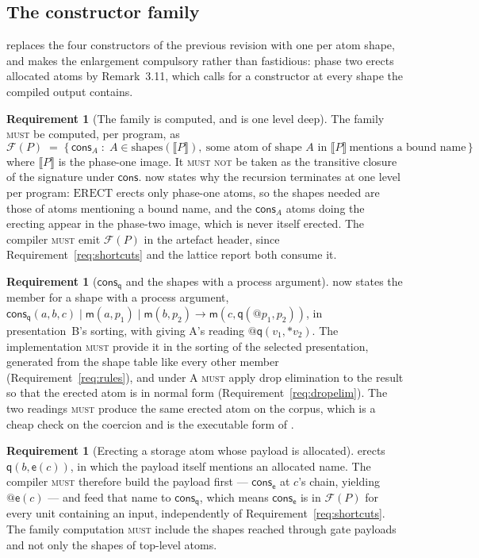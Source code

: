 \documentclass[11pt,a4paper]{article}
\makeatletter
\newcommand{\MUST}{\textsc{must}}
\newcommand{\MUSTNOT}{\textsc{must not}}
\newcommand{\quo}[1]{@#1}
\newcommand{\drp}[1]{{*}#1}
\newcommand{\enc}[1]{\llbracket #1 \rrbracket}
\newcommand{\mm}{\mathsf{m}}
\newcommand{\ev}{\mathsf{e}}
\newcommand{\qq}{\mathsf{q}}
\newcommand{\cons}{\mathsf{cons}}
\newcommand{\red}{\longrightarrow}
\newcommand{\shapes}{\mathrm{shapes}}
\newcommand{\ERECT}{\mathrm{ERECT}}
\theoremstyle{definition}
\newtheorem{requirement}[definition]{Requirement}
\theoremstyle{plain}
\makeatother
\begin{document}
\subsection{The constructor family}\label{sec:family}

\cite[Def.~3.8]{draft3} replaces the four constructors of the previous
revision with one per atom shape, and \cite[Rem.~3.13]{draft3} makes the
enlargement compulsory rather than fastidious: phase two erects allocated
atoms by Remark~3.11, which calls for a constructor at every shape the
compiled output contains.

\begin{requirement}[The family is computed, and is one level deep]
\label{req:family}
The family \MUST{} be computed, per program, as
\[
  \mathcal{F}(P) \;=\; \{\,\cons_{A} \;:\; A \in \shapes(\enc{P}),\ \text{some
  atom of shape } A \text{ in } \enc{P}\ \text{mentions a bound name}\,\}
\]
where $\enc{P}$ is the phase-one image. It \MUSTNOT{} be taken as the
transitive closure of the signature under $\cons$. \cite[Rem.~6.15]{draft3}
now states why the recursion terminates at one level per program: $\ERECT$
erects only phase-one atoms, so the shapes needed are those of atoms
mentioning a bound name, and the $\cons_{A}$ atoms doing the erecting appear
in the phase-two image, which is never itself erected. The compiler
\MUST{} emit $\mathcal{F}(P)$ in the artefact header, since
Requirement~\ref{req:shortcuts} and the lattice report both consume it.
\end{requirement}

\begin{requirement}[$\cons_{\qq}$ and the shapes with a process argument]
\label{req:consq}
\cite[Def.~3.8]{draft3} now states the member for a shape with a process
argument, $\cons_{\qq}(a,b,c) \mid \mm(a,p_{1}) \mid \mm(b,p_{2}) \red
\mm(c,\qq(\quo{p_{1}},p_{2}))$, in presentation~B's sorting, with
\cite[Rem.~3.9]{draft3} giving A's reading
$\quo{\qq(v_{1},\drp{v_{2}})}$. The implementation \MUST{} provide it in the
sorting of the selected presentation, generated from the shape table like
every other member (Requirement~\ref{req:rules}), and under A \MUST{} apply
drop elimination to the result so that the erected atom is in normal form
(Requirement~\ref{req:dropelim}). The two readings \MUST{} produce the same
erected atom on the corpus, which is a cheap check on the coercion and is the
executable form of \cite[Rem.~3.9]{draft3}.
\end{requirement}

\begin{requirement}[Erecting a storage atom whose payload is allocated]
\label{req:qpayload}
\cite[Ex.~6.9]{draft3} erects $\qq(b,\ev(c))$, in which the payload itself
mentions an allocated name. The compiler \MUST{} therefore build the payload
first --- $\cons_{\ev}$ at $c$'s chain, yielding $\quo{\ev(c)}$ --- and feed
that name to $\cons_{\qq}$, which means $\cons_{\ev}$ is in $\mathcal{F}(P)$
for every unit containing an input, independently of
Requirement~\ref{req:shortcuts}. The family computation \MUST{} include the
shapes reached through gate payloads and not only the shapes of top-level
atoms.
\end{requirement}
\end{document}
